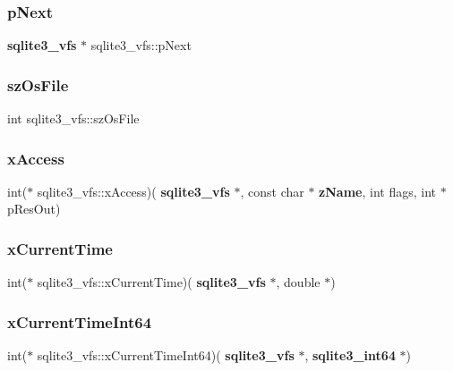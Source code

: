\mbox{\label{structsqlite3__vfs_a4b12c503e4083854a9c4d91697a12de3}} 
\subsubsection{pNext}
{\footnotesize\ttfamily \textbf{ sqlite3\+\_\+vfs} $\ast$ sqlite3\+\_\+vfs\+::p\+Next}

\mbox{\label{structsqlite3__vfs_a549399081342d61134b6398562a0a997}} 
\subsubsection{szOsFile}
{\footnotesize\ttfamily int sqlite3\+\_\+vfs\+::sz\+Os\+File}

\mbox{\label{structsqlite3__vfs_ab4344474034c2dbc9223a362c65ff235}} 
\subsubsection{xAccess}
{\footnotesize\ttfamily int($\ast$ sqlite3\+\_\+vfs\+::x\+Access)(\textbf{ sqlite3\+\_\+vfs} $\ast$, const char $\ast$\textbf{ z\+Name}, int flags, int $\ast$p\+Res\+Out)}

\mbox{\label{structsqlite3__vfs_ab85a8a3ab59f76a6685508fefaa7b691}} 
\subsubsection{xCurrentTime}
{\footnotesize\ttfamily int($\ast$ sqlite3\+\_\+vfs\+::x\+Current\+Time)(\textbf{ sqlite3\+\_\+vfs} $\ast$, double $\ast$)}

\mbox{\label{structsqlite3__vfs_aa281584c422969b7f0df0e5f918fc590}} 
\subsubsection{xCurrentTimeInt64}
{\footnotesize\ttfamily int($\ast$ sqlite3\+\_\+vfs\+::x\+Current\+Time\+Int64)(\textbf{ sqlite3\+\_\+vfs} $\ast$, \textbf{ sqlite3\+\_\+int64} $\ast$)}

